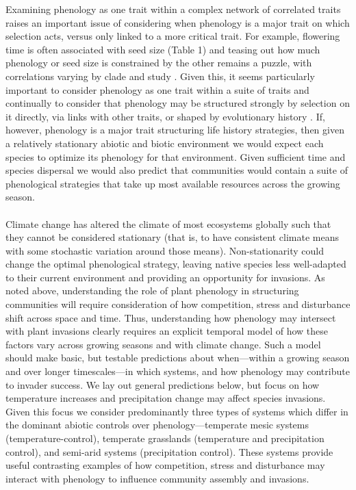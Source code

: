\documentclass[11pt,a4paper,oneside]{article}
\begin{document}
Examining phenology as one trait within a complex network of correlated traits raises an important issue of considering when phenology is a major trait on which selection acts, versus only linked to a more critical trait. For example, flowering time is often associated with seed size (Table 1) and teasing out how much phenology or seed size is constrained by the other remains a puzzle, with correlations varying by clade and study \citep{Mazer:1989in,Bolmgren:2008vo}. Given this, it seems particularly important to consider phenology as one trait  within a suite of traits and continually to consider that phenology may be structured strongly by selection on it directly, via links with other traits, or shaped by evolutionary history \citep[see][and `How does evolutionary history influence phenological invasions?' below]{Lechowicz:1984cr,Ollerton:1992kf}. If, however, phenology is a major trait structuring life history strategies, then given a relatively stationary abiotic and biotic environment we would expect each species to optimize its phenology for that environment. Given sufficient time and species dispersal we would also predict that communities would contain a suite of phenological strategies that take up most available resources across the growing season.\\

\\
\noindent Climate change has altered the climate of most ecosystems globally such that they cannot be considered stationary (that is, to have consistent climate means with some stochastic variation around those means). Non-stationarity could change the optimal phenological strategy, leaving native species less well-adapted to their current environment and providing an opportunity for invasions. As noted above, understanding the role of plant phenology in structuring communities will require consideration of how competition, stress and disturbance shift across space and time. Thus, understanding how phenology may intersect with plant invasions clearly requires an explicit temporal model of how these factors vary across growing seasons and with climate change. Such a model should make basic, but testable predictions about when---within a growing season and over longer timescales---in which systems, and how phenology may contribute to invader success. We lay out general predictions below, but focus on how temperature increases and precipitation change may affect species invasions. Given this focus we consider predominantly three types of systems which differ in the dominant abiotic controls over phenology---temperate mesic systems (temperature-control), temperate grasslands (temperature and precipitation control), and semi-arid systems (precipitation control). These systems provide useful contrasting examples of how competition, stress and disturbance may interact with phenology to influence community assembly and invasions. %
\end{document}
